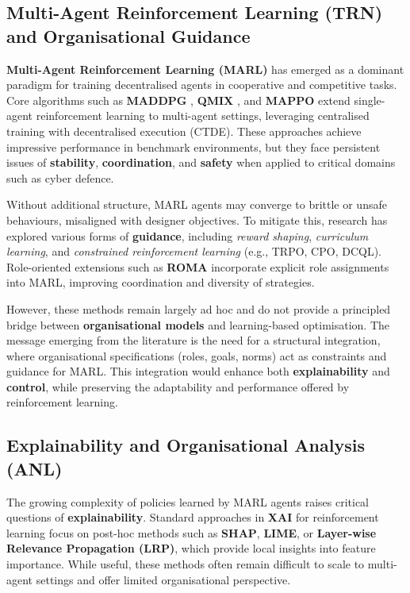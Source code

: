 \documentclass[a4paper,10pt,twocolumn]{article}
\begin{document}
\subsection{Multi-Agent Reinforcement Learning (TRN) and Organisational Guidance}

\textbf{Multi-Agent Reinforcement Learning (MARL)} has emerged as a
dominant paradigm for training decentralised agents in cooperative and
competitive tasks. Core algorithms such as \textbf{MADDPG}
\cite{lowe2017}, \textbf{QMIX} \cite{rashid2018}, and
\textbf{MAPPO} extend single-agent reinforcement learning to multi-agent
settings, leveraging centralised training with decentralised execution
(CTDE). These approaches achieve impressive performance in benchmark
environments, but they face persistent issues of \textbf{stability},
\textbf{coordination}, and \textbf{safety} when applied to critical
domains such as cyber defence.

Without additional structure, MARL agents may converge to brittle or
unsafe behaviours, misaligned with designer objectives. To mitigate
this, research has explored various forms of \textbf{guidance},
including \textit{reward shaping}, \textit{curriculum learning}, and
\textit{constrained reinforcement learning} (e.g., TRPO, CPO, DCQL).
Role-oriented extensions such as \textbf{ROMA} incorporate explicit
role assignments into MARL, improving coordination and diversity of
strategies.

However, these methods remain largely ad hoc and do not provide a
principled bridge between \textbf{organisational models} and
learning-based optimisation. The message emerging from the literature
is the need for a structural integration, where organisational
specifications (roles, goals, norms) act as constraints and guidance
for MARL. This integration would enhance both \textbf{explainability}
and \textbf{control}, while preserving the adaptability and performance
offered by reinforcement learning.

\subsection{Explainability and Organisational Analysis (ANL)}

The growing complexity of policies learned by MARL agents raises
critical questions of \textbf{explainability}. Standard approaches in
\textbf{XAI} for reinforcement learning focus on post-hoc methods such
as \textbf{SHAP}, \textbf{LIME}, or \textbf{Layer-wise Relevance
    Propagation (LRP)}, which provide local insights into feature
importance. While useful, these methods often remain difficult to scale
to multi-agent settings and offer limited organisational perspective.
\end{document}
